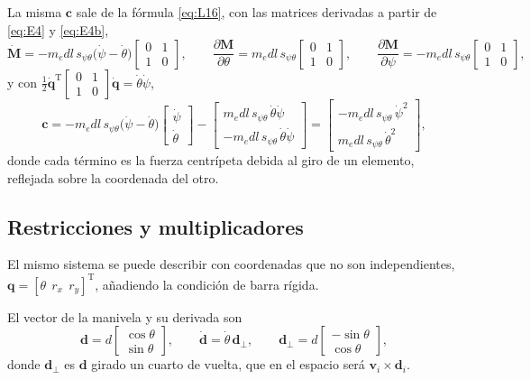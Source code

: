 \documentclass[11pt]{article}
\newcommand{\T}{^{\mathrm{T}}}
\newcommand{\pd}[2]{\frac{\partial #1}{\partial #2}}
\begin{document}
La misma $\mathbf{c}$ sale de la fórmula \eqref{eq:L16}, con las matrices derivadas a partir de \eqref{eq:E4} y \eqref{eq:E4b},
\begin{equation}
\dot{\mathbf{M}}=-m_edl\,s_{\psi\theta}\big(\dot\psi-\dot\theta\big)\begin{bmatrix}0 & 1\\ 1 & 0\end{bmatrix},
\qquad
\pd{\mathbf{M}}{\theta}=m_edl\,s_{\psi\theta}\begin{bmatrix}0 & 1\\ 1 & 0\end{bmatrix},
\qquad
\pd{\mathbf{M}}{\psi}=-m_edl\,s_{\psi\theta}\begin{bmatrix}0 & 1\\ 1 & 0\end{bmatrix},
\label{eq:E9}
\end{equation}
y con $\tfrac12\dot{\mathbf{q}}\T\begin{bmatrix}0 & 1\\ 1 & 0\end{bmatrix}\dot{\mathbf{q}}=\dot\theta\dot\psi$,
\begin{equation}
\mathbf{c}=
-m_edl\,s_{\psi\theta}\big(\dot\psi-\dot\theta\big)\begin{bmatrix}\dot\psi\\ \dot\theta\end{bmatrix}
-\begin{bmatrix}m_edl\,s_{\psi\theta}\,\dot\theta\dot\psi\\ -m_edl\,s_{\psi\theta}\,\dot\theta\dot\psi\end{bmatrix}
=\begin{bmatrix}-m_edl\,s_{\psi\theta}\,\dot\psi^2\\ m_edl\,s_{\psi\theta}\,\dot\theta^2\end{bmatrix},
\label{eq:E10}
\end{equation}
donde cada término es la fuerza centrípeta debida al giro de un elemento, reflejada sobre la coordenada del otro.

\subsection{Restricciones y multiplicadores}

El mismo sistema se puede describir con coordenadas que no son independientes, $\mathbf{q}=[\theta\ \ r_x\ \ r_y]\T$, añadiendo la condición de barra rígida.

El vector de la manivela y su derivada son
\begin{equation}
\mathbf{d}=d\begin{bmatrix}\cos\theta\\ \sin\theta\end{bmatrix},
\qquad
\dot{\mathbf{d}}=\dot\theta\,\mathbf{d}_{\perp},
\qquad
\mathbf{d}_{\perp}=d\begin{bmatrix}-\sin\theta\\ \cos\theta\end{bmatrix},
\label{eq:R0}
\end{equation}
donde $\mathbf{d}_{\perp}$ es $\mathbf{d}$ girado un cuarto de vuelta, que en el espacio será $\mathbf{v}_i\times\mathbf{d}_i$.
\end{document}
